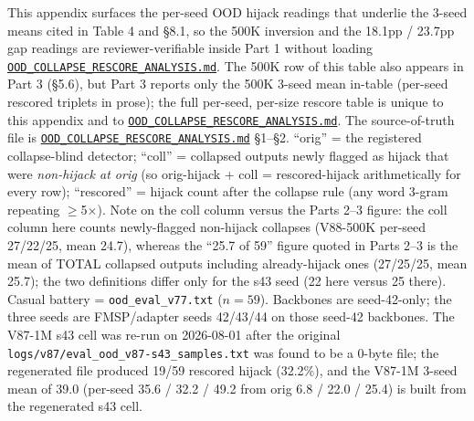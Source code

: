 \documentclass[11pt]{article}
\begin{document}
This appendix surfaces the per-seed OOD hijack readings that underlie the 3-seed means cited in Table 4 and \S8.1, so the 500K inversion and the 18.1pp / 23.7pp gap readings are reviewer-verifiable inside Part 1 without loading \href{https://github.com/llaa33219/MicroMixer-4/blob/4bb630413dfa58ef3141291e121ab8c006d03235/OOD_COLLAPSE_RESCORE_ANALYSIS.md}{\texttt{OOD\_COLLAPSE\_RESCORE\_ANALYSIS.md}}. The 500K row of this table also appears in Part 3 (\S5.6), but Part 3 reports only the 500K 3-seed mean in-table (per-seed rescored triplets in prose); the full per-seed, per-size rescore table is unique to this appendix and to \href{https://github.com/llaa33219/MicroMixer-4/blob/4bb630413dfa58ef3141291e121ab8c006d03235/OOD_COLLAPSE_RESCORE_ANALYSIS.md}{\texttt{OOD\_COLLAPSE\_RESCORE\_ANALYSIS.md}}. The source-of-truth file is \href{https://github.com/llaa33219/MicroMixer-4/blob/4bb630413dfa58ef3141291e121ab8c006d03235/OOD_COLLAPSE_RESCORE_ANALYSIS.md}{\texttt{OOD\_COLLAPSE\_RESCORE\_ANALYSIS.md}} \S1--\S2. ``orig'' = the registered collapse-blind detector; ``coll'' = collapsed outputs newly flagged as hijack that were \emph{non-hijack at orig} (so orig-hijack + coll = rescored-hijack arithmetically for every row); ``rescored'' = hijack count after the collapse rule (any word 3-gram repeating $\geq$5$\times$). Note on the coll column versus the Parts 2--3 figure: the coll column here counts newly-flagged non-hijack collapses (V88-500K per-seed 27/22/25, mean 24.7), whereas the ``25.7 of 59'' figure quoted in Parts 2--3 is the mean of TOTAL collapsed outputs including already-hijack ones (27/25/25, mean 25.7); the two definitions differ only for the s43 seed (22 here versus 25 there). Casual battery = \texttt{ood\_eval\_v77.txt} ($n=59$). Backbones are seed-42-only; the three seeds are FMSP/adapter seeds 42/43/44 on those seed-42 backbones. The V87-1M s43 cell was re-run on 2026-08-01 after the original \texttt{logs/v87/eval\_ood\_v87-s43\_samples.txt} was found to be a 0-byte file; the regenerated file produced 19/59 rescored hijack (32.2\%), and the V87-1M 3-seed mean of 39.0 (per-seed 35.6 / 32.2 / 49.2 from orig 6.8 / 22.0 / 25.4) is built from the regenerated s43 cell.
\end{document}
